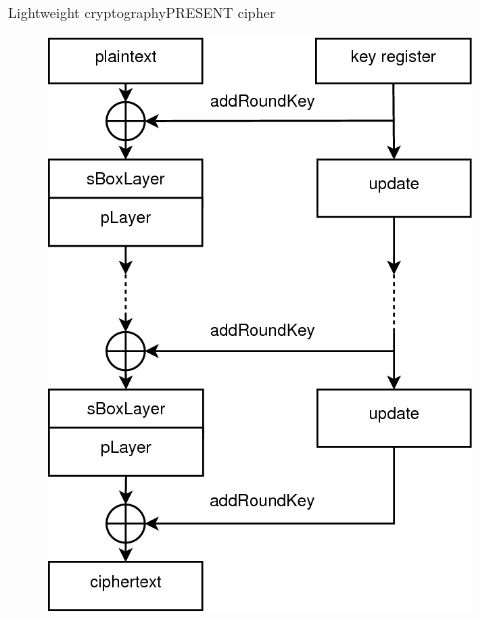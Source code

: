 \documentclass[10pt, ucs]{beamer}
\begin{document}
\begin{frame}{Lightweight cryptography}{PRESENT cipher}
\begin{minipage}[t]{0.35\linewidth}
\begin{figure}[h]
            \centering
            \includegraphics[scale=0.2]{present}
            \label{fig:present}
        \end{figure}
    \end{minipage}
\end{frame}
\end{document}
